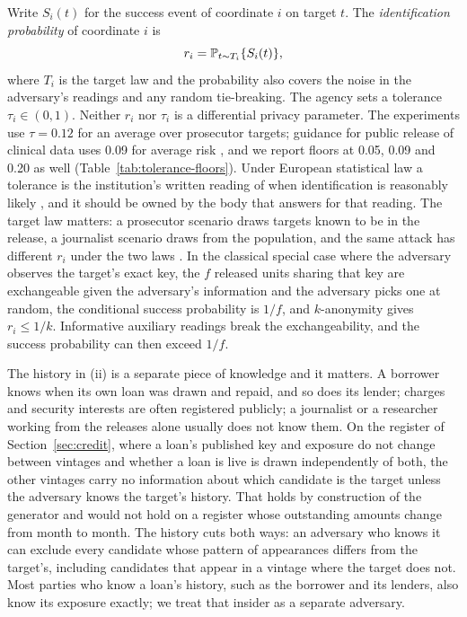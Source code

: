 Write $S_i(t)$ for the success event of coordinate $i$ on target $t$. The \emph{identification probability} of coordinate $i$ is
\begin{equation}\label{eq:risk}
r_i=\mathbb P_{t\sim T_i}\{S_i(t)\},
\end{equation}
where $T_i$ is the target law and the probability also covers the noise in the adversary's readings and any random tie-breaking. The agency sets a tolerance $\tau_i\in(0,1)$. Neither $r_i$ nor $\tau_i$ is a differential privacy parameter. The experiments use $\tau=0.12$ for an average over prosecutor targets; guidance for public release of clinical data uses 0.09 for average risk \cite{ema2016}, and we report floors at 0.05, 0.09 and 0.20 as well (Table~\ref{tab:tolerance-floors}). Under European statistical law a tolerance is the institution's written reading of when identification is reasonably likely \cite{ec2533}, and it should be owned by the body that answers for that reading. The target law matters: a prosecutor scenario draws targets known to be in the release, a journalist scenario draws from the population, and the same attack has different $r_i$ under the two laws \cite{duncan1989,hundepool2012}. In the classical special case where the adversary observes the target's exact key, the $f$ released units sharing that key are exchangeable given the adversary's information and the adversary picks one at random, the conditional success probability is $1/f$, and $k$-anonymity gives $r_i\le1/k$. Informative auxiliary readings break the exchangeability, and the success probability can then exceed $1/f$.

The history in (ii) is a separate piece of knowledge and it matters. A borrower knows when its own loan was drawn and repaid, and so does its lender; charges and security interests are often registered publicly; a journalist or a researcher working from the releases alone usually does not know them. On the register of Section~\ref{sec:credit}, where a loan's published key and exposure do not change between vintages and whether a loan is live is drawn independently of both, the other vintages carry no information about which candidate is the target unless the adversary knows the target's history. That holds by construction of the generator and would not hold on a register whose outstanding amounts change from month to month. The history cuts both ways: an adversary who knows it can exclude every candidate whose pattern of appearances differs from the target's, including candidates that appear in a vintage where the target does not. Most parties who know a loan's history, such as the borrower and its lenders, also know its exposure exactly; we treat that insider as a separate adversary.

